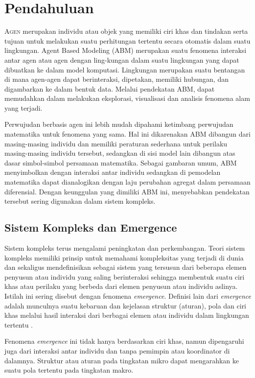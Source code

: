\section{Pendahuluan}

\lettrine[nindent=-0.01em,findent=0.2em]{A}{gen} merupakan individu atau objek yang memiliki ciri khas dan tindakan serta tujuan untuk melakukan suatu perhitungan tertentu secara otomatis dalam suatu lingkungan. Agent Based Modeling (ABM) merupakan suatu fenomena interaksi antar agen atau agen dengan ling-kungan dalam suatu lingkungan yang dapat dibuatkan ke dalam model komputasi. Lingkungan merupakan suatu bentangan di mana agen-agen dapat berinteraksi, dipetakan, memiliki hubungan, dan digambarkan ke dalam bentuk data. Melalui pendekatan ABM, dapat memudahkan dalam melakukan eksplorasi, visualisasi dan analisis fenomena alam yang terjadi.

Perwujudan berbasis agen ini lebih mudah dipahami ketimbang perwujudan matematika untuk fenomena yang sama. Hal ini dikarenakan ABM dibangun dari masing-masing individu dan memiliki peraturan sederhana untuk perilaku masing-masing individu tersebut, sedangkan di sisi model lain dibangun atas dasar simbol-simbol persamaan matematika. Sebagai gambaran umum, ABM menyimbolkan dengan interaksi antar individu sedangkan di pemodelan matematika dapat dianalogikan dengan laju perubahan agregat dalam persamaan diferensial. Dengan keunggulan yang dimiliki ABM ini, menyebabkan pendekatan tersebut sering digunakan dalam sistem kompleks.

\subsection{Sistem Kompleks dan Emergence}

Sistem kompleks terus mengalami peningkatan dan perkembangan. Teori sistem kompleks memiliki prinsip untuk memahami kompleksitas yang terjadi di dunia dan sekaligus mendefinisikan sebagai sistem yang tersusun dari beberapa elemen penyusun atau individu yang saling berinteraksi sehingga membentuk suatu ciri khas atau perilaku yang berbeda dari elemen penyusun atau individu aslinya. Istilah ini sering disebut dengan fenomena \textit{emergence}. Definisi lain dari \textit{emergence} adalah munculnya suatu kebaruan dan kejelasan struktur (aturan), pola dan ciri khas melalui hasil interaksi dari berbagai elemen atau individu dalam lingkungan tertentu \cite{wilensky2015introduction}.

Fenomena \textit{emergence} ini tidak hanya berdasarkan ciri khas, namun dipengaruhi juga dari interaksi antar individu dan tanpa pemimpin atau koordinator di dalamnya. Struktur atau aturan pada tingkatan mikro dapat mengarahkan ke suatu pola tertentu pada tingkatan makro.

